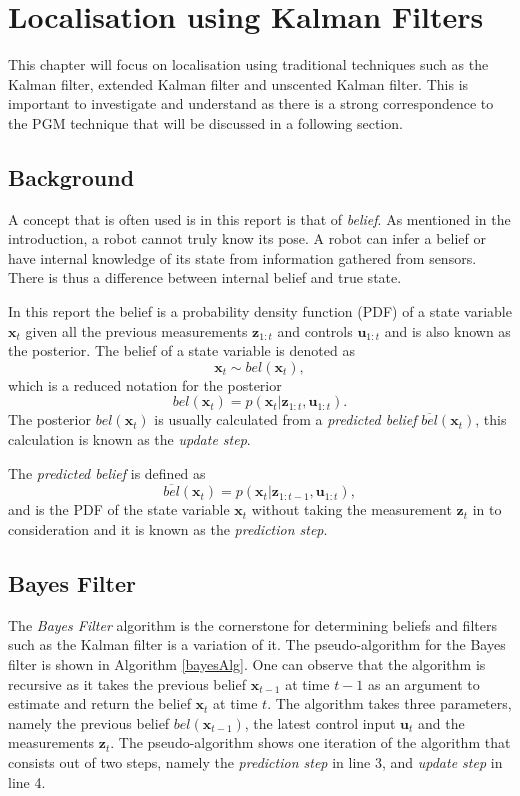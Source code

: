 \documentclass[12pt,oneside,openany,a4paper, %
afrikaans,english,
]{memoir}
\numberwithin{equation}{chapter}
\begin{document}
\chapter{Localisation using Kalman Filters}\label{chap:kalmanFilter}
This chapter will focus on localisation using traditional techniques such as the Kalman filter, extended Kalman filter and unscented Kalman filter. This is important to investigate and understand as there is a strong correspondence to the PGM technique that will be discussed in a following section.
\section{Background}
A concept that is often used is in this report is that of \textit{belief}. As mentioned in the introduction, a robot cannot truly know its pose. A robot can infer a belief or have internal knowledge of its state from information gathered from sensors. There is thus a difference between internal belief and true state.

In this report the belief is a probability density function (PDF) of a state variable $\bm{x}_t$ given all the previous measurements $\bm{z}_{1:t}$  and controls $\bm{u}_{1:t}$ and is also known as the posterior. The belief of a state variable is denoted as
\begin{equation}
\bm{x}_t \sim bel(\bm{x}_t),
\end{equation}
which is a reduced notation for the posterior
\begin{equation}
bel(\bm{x}_t) = p(\bm{x}_t| \bm{z}_{1:t}, \bm{u}_{1:t}).
\end{equation}
The posterior $bel(\bm{x}_t)$ is usually calculated from a \textit{predicted belief} $\overline{bel}(\bm{x}_t)$, this calculation is known as the \textit{update step}.

The \textit{predicted belief} is defined as
\begin{equation}
\overline{bel}(\bm{x}_t) = p(\bm{x}_t|\bm{z}_{1:t-1}, \bm{u}_{1:t}),
\end{equation} 
and is the PDF of the state variable $\bm{x}_t$ without taking the measurement $\bm{z}_t$ in to consideration and it is known as the \textit{prediction step}.
\section{Bayes Filter}
The \textit{Bayes Filter} algorithm is the cornerstone for determining beliefs and filters such as the Kalman filter is a variation of it. The pseudo-algorithm for the Bayes filter is shown in Algorithm \ref{bayesAlg}. One can observe that the algorithm is recursive as it takes the previous belief $\bm{x}_{t-1}$ at time $t-1$ as an argument to estimate and return the belief $\bm{x}_t$ at time $t$. The algorithm takes three parameters, namely the previous belief $bel(\bm{x}_{t-1})$, the latest control input $\bm{u}_t$ and the measurements $\bm{z}_t$. The pseudo-algorithm shows one iteration of the algorithm that consists out of two steps, namely the \textit{prediction step} in line 3, and \textit{update step} in line 4.
\end{document}
